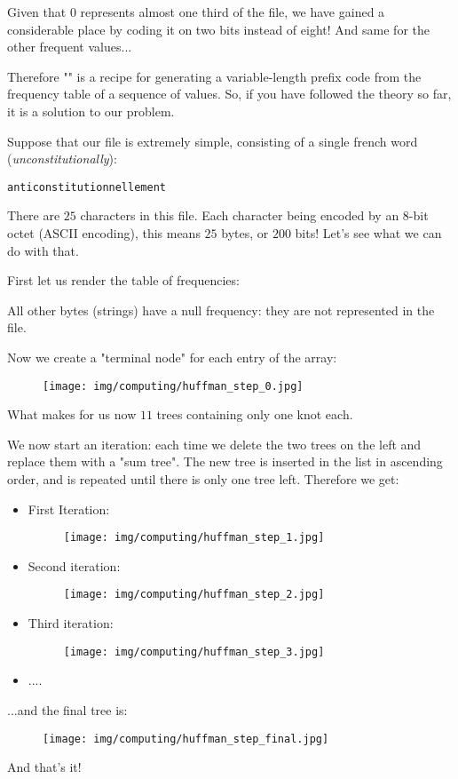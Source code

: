 	Given that $0$ represents almost one third of the file, we have gained a considerable place by coding it on two bits instead of eight! And same for the other frequent values...

	Therefore "" is a recipe for generating a variable-length prefix code from the frequency table of a sequence of values. So, if you have followed the theory so far, it is a solution to our problem.

	Suppose that our file is extremely simple, consisting of a single french word (\textit{unconstitutionally}):
	\begin{center}
		\texttt{anticonstitutionnellement}
	\end{center}
	There are $25$ characters in this file. Each character being encoded by an $8$-bit octet (ASCII encoding), this means $25$ bytes, or $200$ bits! Let's see what we can do with that.

	First let us render the table of frequencies:
	
	All other bytes (strings) have a null frequency: they are not represented in the file.

	Now we create a "terminal node" for each entry of the array:
	\begin{figure}[H]
		\centering
		\texttt{[image: img/computing/huffman\_step\_0.jpg]}
	\end{figure}
	What makes for us now $11$ trees containing only one knot each.

	We now start an iteration: each time we delete the two trees on the left and replace them with a "sum tree". The new tree is inserted in the list in ascending order, and is repeated until there is only one tree left. Therefore we get:
	\begin{itemize}
		\item First Iteration:
		\begin{figure}[H]
			\centering
			\texttt{[image: img/computing/huffman\_step\_1.jpg]}
		\end{figure}
		
		\item Second iteration:
		\begin{figure}[H]
			\centering
			\texttt{[image: img/computing/huffman\_step\_2.jpg]}
		\end{figure}
		
		\item Third iteration:
		\begin{figure}[H]
			\centering
			\texttt{[image: img/computing/huffman\_step\_3.jpg]}
		\end{figure}
		
		\item ....
	\end{itemize}
	...and the final tree is:
	\begin{figure}[H]
		\centering
		\texttt{[image: img/computing/huffman\_step\_final.jpg]}
	\end{figure}
	And that's it!

